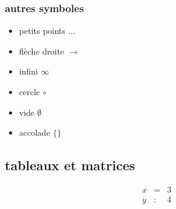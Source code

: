 \subsubsection{autres symboles}

\begin{itemize}
	\item petits points  $\dots$
	\item flèche droite  $\rightarrow$
	\item infini $\infty$
	\item cercle $\circ$
	\item vide $\emptyset$
	\item accolade $\lbrace \rbrace$
\end{itemize}

\subsection{tableaux et matrices}

\begin{equation}
	\begin{array}{lcc}
	x & = & 3 \\
	y & : & 4	
	\end{array}
\end{equation}
